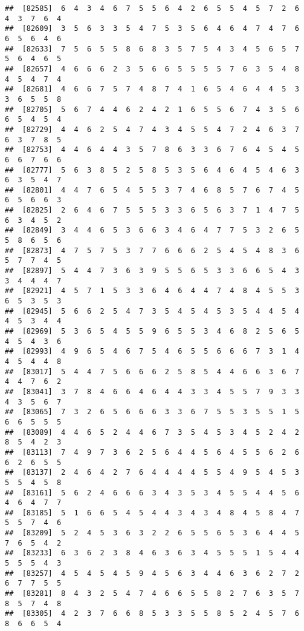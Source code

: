 \documentclass[
]{book}
\begin{document}
\begin{verbatim}
##  [82585]  6  4  3  4  6  7  5  5  6  4  2  6  5  5  4  5  7  2  6  4  3  7  6  4
##  [82609]  3  5  6  3  3  5  4  7  5  3  5  6  4  6  4  7  4  7  6  6  5  6  4  6
##  [82633]  7  5  6  5  5  8  6  8  3  5  7  5  4  3  4  5  6  5  7  5  6  4  6  5
##  [82657]  4  6  6  6  2  3  5  6  6  5  5  5  5  7  6  3  5  4  8  4  5  4  7  4
##  [82681]  4  6  6  7  5  7  4  8  7  4  1  6  5  4  6  4  4  5  3  3  6  5  5  8
##  [82705]  5  6  7  4  4  6  2  4  2  1  6  5  5  6  7  4  3  5  6  6  5  4  5  4
##  [82729]  4  4  6  2  5  4  7  4  3  4  5  5  4  7  2  4  6  3  7  6  3  7  8  5
##  [82753]  4  4  6  4  4  3  5  7  8  6  3  3  6  7  6  4  5  4  5  6  6  7  6  6
##  [82777]  5  6  3  8  5  2  5  8  5  3  5  6  4  6  4  5  4  6  3  6  3  5  4  7
##  [82801]  4  4  7  6  5  4  5  5  3  7  4  6  8  5  7  6  7  4  5  6  5  6  6  3
##  [82825]  2  6  4  6  7  5  5  5  3  3  6  5  6  3  7  1  4  7  5  6  3  4  5  2
##  [82849]  3  4  4  6  5  3  6  6  3  4  6  4  7  7  5  3  2  6  5  5  8  6  5  6
##  [82873]  4  7  5  7  5  3  7  7  6  6  6  2  5  4  5  4  8  3  6  5  7  7  4  5
##  [82897]  5  4  4  7  3  6  3  9  5  5  6  5  3  3  6  6  5  4  3  3  4  4  4  7
##  [82921]  4  5  7  1  5  3  3  6  4  6  4  4  7  4  8  4  5  5  3  6  5  3  5  3
##  [82945]  5  6  6  2  5  4  7  3  5  4  5  4  5  3  5  4  4  5  4  4  5  3  4  4
##  [82969]  5  3  6  5  4  5  5  9  6  5  5  3  4  6  8  2  5  6  5  4  5  4  3  6
##  [82993]  4  9  6  5  4  6  7  5  4  6  5  5  6  6  6  7  3  1  4  4  5  4  4  8
##  [83017]  5  4  4  7  5  6  6  6  2  5  8  5  4  4  6  6  3  6  7  4  4  7  6  2
##  [83041]  3  7  8  4  6  6  4  6  4  4  3  3  4  5  5  7  9  3  3  4  3  5  6  7
##  [83065]  7  3  2  6  5  6  6  6  3  3  6  7  5  5  3  5  5  1  5  6  6  5  5  5
##  [83089]  4  4  6  5  2  4  4  6  7  3  5  4  5  3  4  5  2  4  2  8  5  4  2  3
##  [83113]  7  4  9  7  3  6  2  5  6  4  4  5  6  4  5  5  6  2  6  6  2  6  5  5
##  [83137]  2  4  6  4  2  7  6  4  4  4  4  5  5  4  9  5  4  5  3  5  5  4  5  8
##  [83161]  5  6  2  4  6  6  6  3  4  3  5  3  4  5  5  4  4  5  6  4  6  4  7  7
##  [83185]  5  1  6  6  5  4  5  4  4  3  4  3  4  8  4  5  8  4  7  5  5  7  4  6
##  [83209]  5  2  4  5  3  6  3  2  2  6  5  5  6  5  3  6  4  4  5  7  6  5  4  2
##  [83233]  6  3  6  2  3  8  4  6  3  6  3  4  5  5  5  1  5  4  4  5  5  5  4  3
##  [83257]  4  5  4  5  4  5  9  4  5  6  3  4  4  6  3  6  2  7  2  6  7  7  5  5
##  [83281]  8  4  3  2  5  4  7  4  6  6  5  5  8  2  7  6  3  5  7  8  5  7  4  8
##  [83305]  4  2  3  7  6  6  8  5  3  3  5  5  8  5  2  4  5  7  6  8  6  6  5  4

\end{verbatim}
\end{document}
